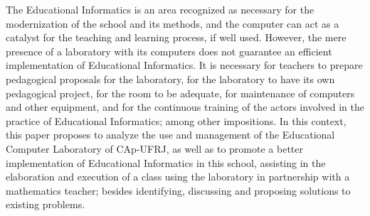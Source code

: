The Educational Informatics is an area recognized as necessary for the modernization of the school and its methods, and the computer can act as a catalyst for the teaching and learning process, if well used. However, the mere presence of a laboratory with its computers does not guarantee an efficient implementation of Educational Informatics. It is necessary for teachers to prepare pedagogical proposals for the laboratory, for the laboratory to have its own pedagogical project, for the room to be adequate, for maintenance of computers and other equipment, and for the continuous training of the actors involved in the practice of Educational Informatics; among other impositions.
In this context, this paper proposes to analyze the use and management of the Educational Computer Laboratory of CAp-UFRJ, as well as to promote a better implementation of Educational Informatics in this school, assisting in the elaboration and execution of a class using the laboratory in partnership with a mathematics teacher; besides identifying, discussing and proposing solutions to existing problems.